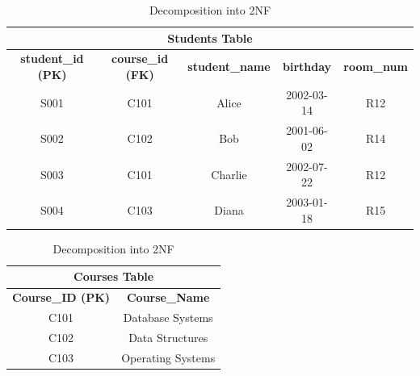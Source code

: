 \begin{table}[h!]
\centering
\caption{Decomposition into 2NF}
\label{tab:order_after_2nf}
\begin{tabular}{|c|c|c|c|c|}
\hline
\multicolumn{5}{|c|}{\textbf{Students Table}} \\
\hline
\textbf{student\_id (PK)} & \textbf{course\_id (FK)} & \textbf{student\_name} & \textbf{birthday} & \textbf{room\_num} \\
\hline
S001 & C101 & Alice & 2002-03-14 & R12 \\
S002 & C102 & Bob & 2001-06-02 & R14 \\
S003 & C101 & Charlie & 2002-07-22 & R12 \\
S004 & C103 & Diana & 2003-01-18 & R15 \\
\hline
\end{tabular}

\vspace{1em}

\begin{tabular}{|c|c|}
\hline
\multicolumn{2}{|c|}{\textbf{Courses Table}} \\
\hline
\textbf{Course\_ID (PK)} & \textbf{Course\_Name} \\
\hline
C101 & Database Systems \\
C102 & Data Structures \\
C103 & Operating Systems \\
\hline
\end{tabular}
\end{table}